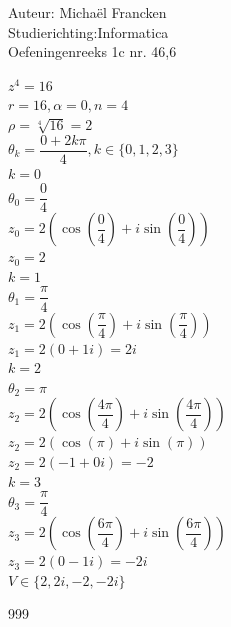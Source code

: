 \documentclass[a4paper]{article}
\begin{document}
\noindent \large Auteur: Michaël Francken\\
\noindent \large Studierichting:Informatica\\
\noindent \large Oefeningenreeks 1c nr. 46,6\\

\normalsize


$z^4 = 16$ \\

$r = 16, \alpha = 0, n = 4$ \\

$\rho = \sqrt[4]{16} = 2$ \\

$\theta_k = \dfrac{0+2k\pi}{4}, k \in \{0, 1, 2, 3\}$\\



$k = 0$ \\

$\theta_0 = \dfrac{0}{4}$ \\

$z_0 = 2 \left(\cos\left(\dfrac{0}{4}\right) + i \sin\left(\dfrac{0}{4}\right)\right)$ \\

$z_0 = 2$\\




$k = 1$ \\

$\theta_1 = \dfrac{\pi}{4}$ \\

$z_1 = 2\left(\cos\left(\dfrac{\pi}{4}\right)+ i \sin\left(\dfrac{\pi}{4}\right)\right)$ \\

$z_1 = 2(0+1i) = 2i$ \\




$k = 2$ \\

$\theta_2 = \pi$ \\

$z_2 = 2\left(\cos\left(\dfrac{4\pi}{4}\right)+ i \sin\left(\dfrac{4\pi}{4}\right)\right)$ \\

$z_2 = 2\left(\cos(\pi)+ i \sin(\pi)\right)$ \\

$z_2 = 2(-1+0i)= -2$\\

$k = 3$ \\

$\theta_3 = \dfrac{\pi}{4}$ \\

$z_3 = 2\left(\cos\left(\dfrac{6\pi}{4}\right)+ i \sin\left(\dfrac{6\pi}{4}\right)\right)$ \\

$z_3 = 2(0 - 1i)= -2i$\\



$V\in\{2,2i,-2,-2i\}$\\

\begin{thebibliography}{999}
\end{thebibliography}
\end{document}
